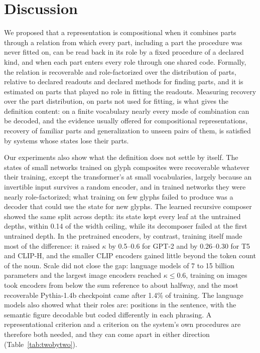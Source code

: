 \documentclass[10pt]{article}
\theoremstyle{plain}
\theoremstyle{remark}
\begin{document}
\section{Discussion}
\label{sec:discussion}

We proposed that a representation is compositional when it combines parts through a relation from which every part, including a part the procedure was never fitted on, can be read back in its role by a fixed procedure of a declared kind, and when each part enters every role through one shared code. Formally, the relation is recoverable and role-factorized over the distribution of parts, relative to declared readouts and declared methods for finding parts, and it is estimated on parts that played no role in fitting the readouts. Measuring recovery over the part distribution, on parts not used for fitting, is what gives the definition content: on a finite vocabulary nearly every mode of combination can be decoded, and the evidence usually offered for compositional representations, recovery of familiar parts and generalization to unseen pairs of them, is satisfied by systems whose states lose their parts.

Our experiments also show what the definition does not settle by itself. The states of small networks trained on glyph composites were recoverable whatever their training, except the transformer's at small vocabularies, largely because an invertible input survives a random encoder, and in trained networks they were nearly role-factorized; what training on few glyphs failed to produce was a decoder that could use the state for new glyphs. The learned recursive composer showed the same split across depth: its state kept every leaf at the untrained depths, within 0.14 of the width ceiling, while its decomposer failed at the first untrained depth. In the pretrained encoders, by contrast, training itself made most of the difference: it raised $\kappa$ by 0.5--0.6 for GPT-2 and by 0.26--0.30 for T5 and CLIP-H, and the smaller CLIP encoders gained little beyond the token count of the noun. Scale did not close the gap: language models of 7 to 15 billion parameters and the largest image encoders reached $\kappa \le 0.6$, training on images took encoders from below the sum reference to about halfway, and the most recoverable Pythia-1.4b checkpoint came after 1.4\% of training. The language models also showed what their roles are: positions in the sentence, with the semantic figure decodable but coded differently in each phrasing. A representational criterion and a criterion on the system's own procedures are therefore both needed, and they can come apart in either direction (Table~\ref{tab:twobytwo}).
\end{document}

